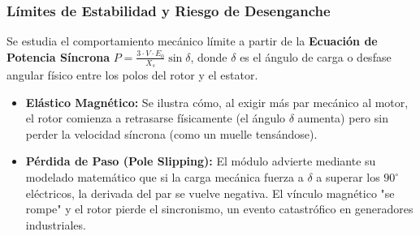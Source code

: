 \documentclass[11pt,a4paper]{article}
\begin{document}
\subsubsection{Límites de Estabilidad y Riesgo de Desenganche}
Se estudia el comportamiento mecánico límite a partir de la \textbf{Ecuación de Potencia Síncrona} $P = \frac{3 \cdot V \cdot E_0}{X_s} \sin \delta$, donde $\delta$ es el ángulo de carga o desfase angular físico entre los polos del rotor y el estator.
\begin{itemize}
    \item \textbf{Elástico Magnético:} Se ilustra cómo, al exigir más par mecánico al motor, el rotor comienza a retrasarse físicamente (el ángulo $\delta$ aumenta) pero sin perder la velocidad síncrona (como un muelle tensándose).
    \item \textbf{Pérdida de Paso (Pole Slipping):} El módulo advierte mediante su modelado matemático que si la carga mecánica fuerza a $\delta$ a superar los $90^\circ$ eléctricos, la derivada del par se vuelve negativa. El vínculo magnético "se rompe" y el rotor pierde el sincronismo, un evento catastrófico en generadores industriales.
\end{itemize}
\end{document}
